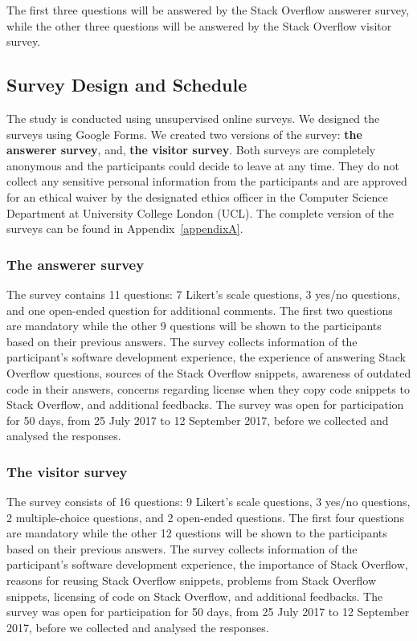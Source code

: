 \documentclass{svjour3}                     %
\begin{document}
The first three questions will be answered by
the Stack Overflow answerer survey, while the other three questions will be
answered by the Stack Overflow visitor survey.

\subsection{Survey Design and Schedule}
The study is conducted using unsupervised online surveys. We designed the surveys using
Google Forms. We created two versions of the
survey: \textbf{the answerer survey}, and, \textbf{the visitor survey}. Both
surveys are completely anonymous and the participants could decide to leave at
any time. They do not collect any sensitive personal information from the
participants and are approved for an ethical waiver by the designated ethics
officer in the Computer Science Department at University College London (UCL). 
The complete version of the surveys can be found in 
Appendix~\ref{appendixA}.

\subsubsection{The answerer survey} 
The survey contains 11 questions: 7 Likert's
scale questions, 3 yes/no questions, and one open-ended question for additional
comments. The first two questions are mandatory while the other 9 questions will
be shown to the participants based on their previous answers. The survey
collects information of the participant's software development experience, the
experience of answering Stack Overflow questions, sources of the Stack Overflow
snippets, awareness of outdated code in their answers, concerns regarding
license when they copy code snippets to Stack Overflow, and additional
feedbacks. The survey was open for participation for 50 days, from 25 July 2017
to 12 September 2017, before we collected and analysed the responses.

\subsubsection{The visitor survey} 
The survey consists of 16 questions: 9 Likert's
scale questions, 3 yes/no questions, 2 multiple-choice questions, and 2
open-ended questions. The first four questions are mandatory while the other 12
questions will be shown to the participants based on their previous answers. The
survey collects information of the participant's software development
experience, the importance of Stack Overflow, reasons for reusing Stack Overflow
snippets, problems from Stack Overflow snippets, licensing of code on Stack
Overflow, and additional feedbacks. The survey was open for participation for 50
days, from 25 July 2017 to 12 September 2017, before we collected and analysed
the responses.
\end{document}
